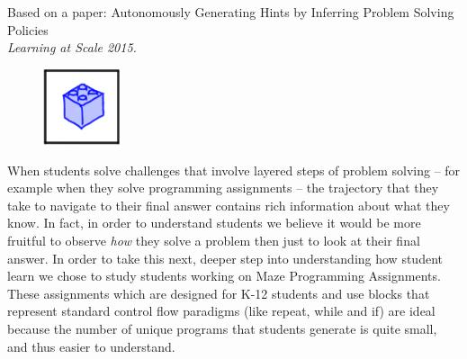 Based on a paper: Autonomously Generating Hints by Inferring Problem
Solving Policies \cite{piech2015autonomously} \\ \emph{Learning at Scale 2015.}

\vspace{7mm}

\begin{figure}[h!]
\includegraphics[width=0.2\textwidth]{img/assnType_2}
\end{figure}

\vspace{7mm}

When students solve challenges that involve layered steps of problem solving -- for example when they solve programming assignments -- the trajectory that they take to navigate to their final answer contains rich information about what they know. In fact, in order to understand students we believe it would be more fruitful to observe \emph{how} they solve a problem  then just to look at their final answer. In order to take this next, deeper step into understanding how student learn we chose to study students working on Maze Programming Assignments. These assignments which are designed for K-12 students and use blocks that represent standard control flow paradigms (like repeat, while and if) are ideal because the number of unique programs that students generate is quite small, and thus easier to understand.


